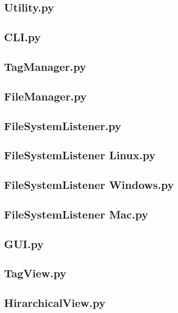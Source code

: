 \documentclass[10pt,paper=a4,final]{scrartcl}
\begin{document}
\subsection{Utility.py}

\subsection{CLI.py}

\subsection{TagManager.py}

\subsection{FileManager.py}

\subsection{FileSystemListener.py}

\subsection{FileSystemListener Linux.py}

\subsection{FileSystemListener Windows.py}

\subsection{FileSystemListener Mac.py}

\subsection{GUI.py}

\subsection{TagView.py}

\subsection{HirarchicalView.py}

\end{document}
